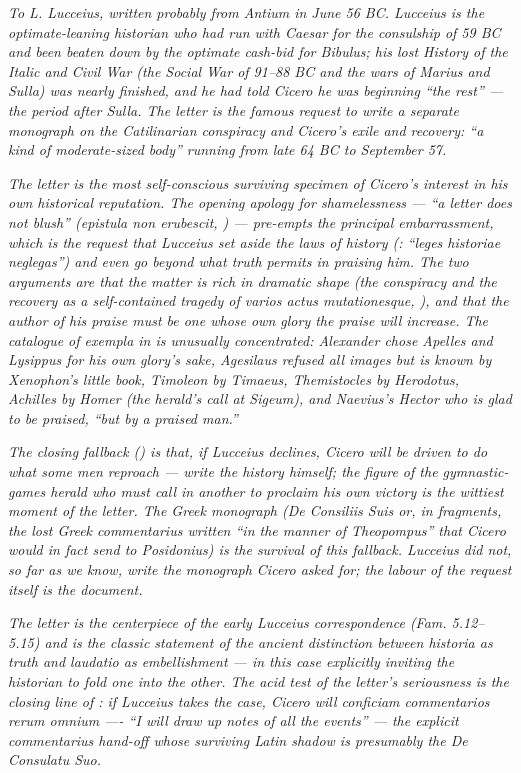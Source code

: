 
\textit{To L. Lucceius, written probably from Antium in
June 56 BC. Lucceius is the optimate-leaning historian
who had run with Caesar for the consulship of 59 BC and
been beaten down by the optimate cash-bid for Bibulus;
his lost \textit{History of the Italic and Civil War}
(the Social War of 91--88 BC and the wars of Marius and
Sulla) was nearly finished, and he had told Cicero he was
beginning ``the rest'' --- the period after Sulla. The
letter is the famous request to write a separate
monograph on the Catilinarian conspiracy and Cicero's
exile and recovery: ``a kind of moderate-sized body''
running from late 64 BC to September 57.}

\textit{The letter is the most self-conscious surviving
specimen of Cicero's interest in his own historical
reputation. The opening apology for shamelessness ---
``a letter does not blush'' (\textit{epistula non
erubescit}, ) --- pre-empts the principal
embarrassment, which is the request that Lucceius set
aside the laws of history (:
``\textit{leges historiae neglegas}'') and even go beyond
what truth permits in praising him. The two arguments are
that the matter is rich in dramatic shape (the
conspiracy and the recovery as a self-contained tragedy
of \textit{varios actus mutationesque}, ),
and that the author of his praise must be one whose own
glory the praise will increase. The catalogue of
exempla in  is unusually concentrated:
Alexander chose Apelles and Lysippus for his own glory's
sake, Agesilaus refused all images but is known by
Xenophon's little book, Timoleon by Timaeus, Themistocles
by Herodotus, Achilles by Homer (the herald's call at
Sigeum), and Naevius's Hector who is glad to be praised,
``but by a praised man.''}

\textit{The closing fallback () is that, if
Lucceius declines, Cicero will be driven to do what some
men reproach --- write the history himself; the figure of
the gymnastic-games herald who must call in another to
proclaim his own victory is the wittiest moment of the
letter. The Greek monograph (\textit{De Consiliis Suis}
or, in fragments, the lost Greek \textit{commentarius}
written ``in the manner of Theopompus'' that Cicero would
in fact send to Posidonius) is the survival of this
fallback. Lucceius did not, so far as we know, write the
monograph Cicero asked for; the labour of the request
itself is the document.}

\textit{The letter is the centerpiece of the early Lucceius
correspondence (\textit{Fam.} 5.12--5.15) and is the
classic statement of the ancient distinction between
\textit{historia} as truth and \textit{laudatio} as
embellishment --- in this case explicitly inviting the
historian to fold one into the other. The acid test of
the letter's seriousness is the closing line of
: if Lucceius takes the case, Cicero will
\textit{conficiam commentarios rerum omnium} ---- ``I will
draw up notes of all the events'' --- the explicit
\textit{commentarius} hand-off whose surviving Latin
shadow is presumably the \textit{De Consulatu Suo}.}

